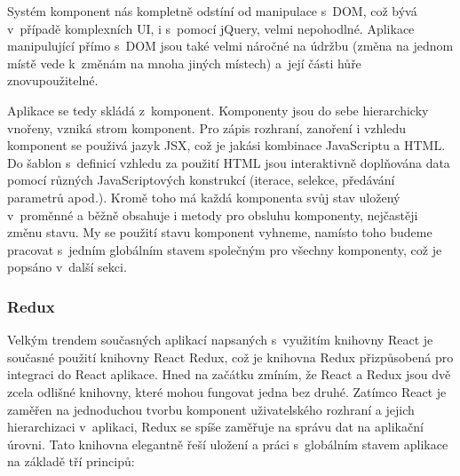 Systém komponent nás kompletně odstíní od manipulace s~DOM, což bývá v~případě komplexních UI, i s~pomocí jQuery, velmi nepohodlné. Aplikace manipulující přímo s~DOM jsou také velmi náročné na údržbu (změna na jednom místě vede k~změnám na mnoha jiných místech) a~její části hůře znovupoužitelné.

Aplikace se tedy skládá z~komponent. Komponenty jsou do sebe hierarchicky vnořeny, vzniká strom komponent. Pro zápis rozhraní, zanoření i vzhledu komponent se použivá jazyk JSX, což je jakási kombinace JavaScriptu a HTML. Do šablon s~definicí vzhledu za použití HTML jsou interaktivně doplňována data pomocí různých JavaScriptových konstrukcí (iterace, selekce, předávání parametrů apod.). Kromě toho má každá komponenta svůj stav uložený v~proměnné a běžně obsahuje i metody pro obsluhu komponenty, nejčastěji změnu stavu. My se použití stavu komponent vyhneme, namísto toho budeme pracovat s~jedním globálním stavem společným pro všechny komponenty, což je popsáno v~další sekci.


\subsubsection{Redux}
Velkým trendem současných aplikací napsaných s~využitím knihovny React je současné použití knihovny React Redux, což je knihovna Redux přizpůsobená pro integraci do React aplikace. Hned na začátku zmíním, že React a Redux jsou dvě zcela odlišné knihovny, které mohou fungovat jedna bez druhé. Zatímco React je zaměřen na jednoduchou tvorbu komponent uživatelského rozhraní a jejich hierarchizaci v~aplikaci, Redux se spíše zaměřuje na správu dat na aplikační úrovni. Tato knihovna elegantně řeší uložení a práci s~globálním stavem aplikace na základě tří principů:

